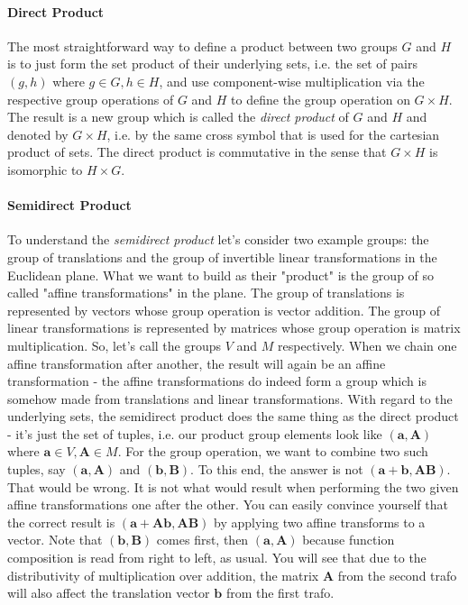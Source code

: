 \paragraph{Direct Product}
The most straightforward way to define a product between two groups $G$ and $H$ is to just form the set product of their underlying sets, i.e. the set of pairs $(g,h)$ where $g \in G, h \in H$, and use component-wise multiplication via the respective group operations of $G$ and $H$ to define the group operation on $G \times H$. The result is a new group which is called the \emph{direct product} of $G$ and $H$ and denoted by $G \times H$, i.e. by the same cross symbol that is used for the cartesian product of sets. The direct product is commutative in the sense that $G \times H$ is isomorphic to $H \times G$.


\paragraph{Semidirect Product}
To understand the \emph{semidirect product} let's consider two example groups: the group of translations and the group of invertible linear transformations in the Euclidean plane. What we want to build as their "product" is the group of so called "affine transformations" in the plane. The group of translations is represented by vectors whose group operation is vector addition. The group of linear transformations is represented by matrices whose group operation is matrix multiplication. So, let's call the groups $V$ and $M$ respectively. When we chain one affine transformation after another, the result will again be an affine transformation - the affine transformations do indeed form a group which is somehow made from translations and linear transformations. With regard to the underlying sets, the semidirect product does the same thing as the direct product - it's just the set of tuples, i.e. our product group elements look like $(\mathbf{a},\mathbf{A})$ where $\mathbf{a} \in V, \mathbf{A} \in M$. For the group operation, we want to combine two such tuples, say  $(\mathbf{a},\mathbf{A})$ and $(\mathbf{b},\mathbf{B})$. To this end, the answer is not $(\mathbf{a + b},\mathbf{A B})$. That would be wrong. It is not what would result when performing the two given affine transformations one after the other. You can easily convince yourself that the correct result is $(\mathbf{a + A b},\mathbf{A B})$ by applying two affine transforms to a vector. Note that $(\mathbf{b},\mathbf{B})$ comes first, then $(\mathbf{a},\mathbf{A})$ because function composition is read from right to left, as usual. You will see that due to the distributivity of multiplication over addition, the matrix $\mathbf{A}$ from the second trafo will also affect the translation vector $\mathbf{b}$ from the first trafo. 

